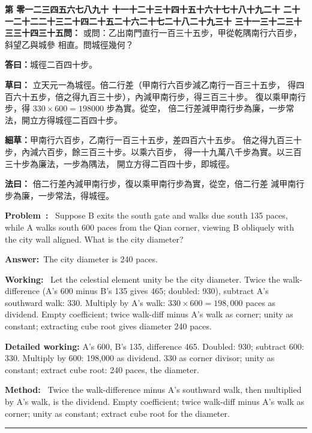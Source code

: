\documentclass[9pt,a4paper]{article}
\newcounter{probnum}
\newcounter{overallnum}
\newcommand{\chnum}[1]{%
  \ifcase#1 零\or 一\or 二\or 三\or 四\or 五\or 六\or 七\or 八\or 九\or 十\or
    十一\or 十二\or 十三\or 十四\or 十五\or 十六\or 十七\or 十八\or 十九\or 二十\or
    二十一\or 二十二\or 二十三\or 二十四\or 二十五\or 二十六\or 二十七\or 二十八\or 二十九\or 三十\or
    三十一\or 三十二\or 三十三\or 三十四\or 三十五\fi}
\newcommand{\problem}[1]{\stepcounter{probnum}\stepcounter{overallnum}\par\noindent\textbf{\color{volcolor}第\chnum{\value{probnum}}問：}#1\par\vspace{0.15cm}}
\newcommand{\answer}[1]{\par\noindent\textbf{答曰：}#1\par\vspace{0.15cm}}
\newcommand{\working}[1]{\par\noindent\textbf{草曰：}#1\par\vspace{0.15cm}}
\newcommand{\method}[1]{\par\noindent\textbf{法曰：}#1\par\vspace{0.25cm}}
\newcommand{\eproblem}[1]{\par\noindent\textbf{\color{volcolor}Problem~\theoverallnum:}~#1\par\vspace{0.15cm}}
\newcommand{\eanswer}[1]{\par\noindent\textbf{Answer:}~#1\par\vspace{0.15cm}}
\newcommand{\eworking}[1]{\par\noindent\textbf{Working:}~#1\par\vspace{0.15cm}}
\newcommand{\emethod}[1]{\par\noindent\textbf{Method:}~#1\par\vspace{0.25cm}}
\begin{document}
\noindent\begin{minipage}[t]{0.48\textwidth}
\problem{
或問：乙出南門直行一百三十五步，甲從乾隅南行六百步，斜望乙與城參
相直。問城徑幾何？
}

\answer{城徑二百四十步。}

\working{
立天元一為城徑。倍二行差（甲南行六百步減乙南行一百三十五步，
得四百六十五步，倍之得九百三十步），內減甲南行步，得三百三十步。
復以乘甲南行步，得 $330 \times 600 = 198000$ 步為實。從空，
倍二行差減甲南行步為廉，一步常法，開立方得城徑二百四十步。

\textbf{細草：}甲南行六百步，乙南行一百三十五步，差四百六十五步。
倍之得九百三十步，內減六百步，餘三百三十步。以乘六百步，
得一十九萬八千步為實。以三百三十步為廉法，一步為隅法，
開立方得二百四十步，即城徑。
}

\method{
倍二行差內減甲南行步，復以乘甲南行步為實，從空，倍二行差
減甲南行步為廉，一步常法，得城徑。
}
\end{minipage}%
\hfill%
\begin{minipage}[t]{0.50\textwidth}
\eproblem{
Suppose B exits the south gate and walks due south 135 paces, while A walks
south 600 paces from the Qian corner, viewing B obliquely with the city wall
aligned. What is the city diameter?
}

\eanswer{The city diameter is 240 paces.}

\eworking{
Let the celestial element unity be the city diameter. Twice the walk-difference
(A's 600 minus B's 135 gives 465; doubled: 930), subtract A's southward walk:
330. Multiply by A's walk: $330 \times 600 = 198{,}000$ paces as dividend.
Empty coefficient; twice walk-diff minus A's walk as corner; unity as constant;
extracting cube root gives diameter 240 paces.

\textbf{Detailed working:} A's 600, B's 135, difference 465. Doubled: 930;
subtract 600: 330. Multiply by 600: 198,000 as dividend. 330 as corner
divisor; unity as constant; extract cube root: 240 paces, the diameter.
}

\emethod{
Twice the walk-difference minus A's southward walk, then multiplied by A's
walk, is the dividend. Empty coefficient; twice walk-diff minus A's walk as
corner; unity as constant; extract cube root for the diameter.
}
\end{minipage}
\vspace{0.15cm}

\vspace{0.15cm}
\noindent\rule{\textwidth}{0.2pt}
\vspace{0.15cm}
\end{document}
